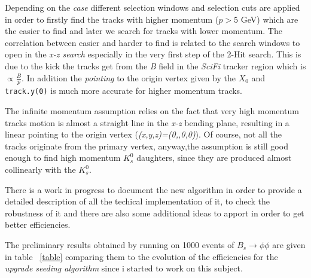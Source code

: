 \documentclass[paper=a4, fontsize=10pt]{scrartcl}
\numberwithin{equation}{section}		%
\numberwithin{figure}{section}			%
\numberwithin{table}{section}				%
\begin{document}
Depending on the \textit{case} different selection windows and selection cuts are applied in order to firstly find the tracks with higher momentum ($p>5$ GeV) which are the easier to find and later we search for tracks with lower momentum. The correlation between easier and harder to find is related to the search windows to open in the \textit{x-z search} especially in the very first step of the 2-Hit search. This is due to the kick the tracks get from the \textit{B} field in the \textit{SciFi} tracker region which is $\propto \frac{B}{p}$. In addition the \textit{pointing} to the origin vertex given by the $X_{0}$ and \texttt{track.y(0)} is much more accurate for higher momentum tracks.

The infinite momentum assumption relies on the fact that very high momentum tracks motion is almost a straight line in the \textit{x-z} bending plane, resulting in a linear pointing to the origin vertex (\textit{(x,y,z)=(0,,0,0)}). Of course, not all the tracks originate from the primary vertex, anyway,the assumption is still good enough to find high momentum $K_s^{0}$ daughters, since they are produced almost collinearly with the $K_{s}^{0}$. 

There is a work in progress to document the new algorithm in order to provide a detailed description of all the techical implementation of it, to check the robustness of it and there are also some additional ideas to apport in order to get better efficiencies. 

The preliminary results obtained by running on 1000 events of $B_s \rightarrow \phi \phi$ are given in table ~\ref{table} comparing them to the evolution of the efficiencies for the \textit{upgrade seeding algorithm} since i started to work on this subject.
\end{document}
